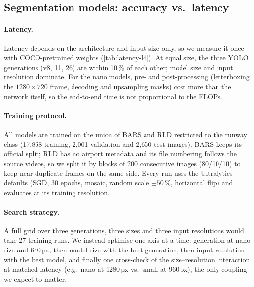 \subsection{Segmentation models: accuracy vs.\ latency}
\label{sec:exp-models}
\paragraph{Latency.}
Latency depends on the architecture and input size only, so we measure it once with COCO-pretrained weights (\cref{tab:latency-l4}).
At equal size, the three YOLO generations (v8, 11, 26) are within 10\,\% of each other; model size and input resolution dominate.
For the nano models, pre- and post-processing (letterboxing the $1280\times720$ frame, decoding and upsampling masks) cost more than the network itself, so the end-to-end time is not proportional to the FLOPs.



\paragraph{Training protocol.}
All models are trained on the union of BARS and RLD restricted to the runway class (17{,}858 training, 2{,}001 validation and 2{,}650 test images).
BARS keeps its official split; RLD has no airport metadata and its file numbering follows the source videos, so we split it by blocks of 200 consecutive images (80/10/10) to keep near-duplicate frames on the same side.
Every run uses the Ultralytics defaults (SGD, 30 epochs, mosaic, random scale $\pm50\,\%$, horizontal flip) and evaluates at its training resolution.

\paragraph{Search strategy.}
A full grid over three generations, three sizes and three input resolutions would take 27 training runs.
We instead optimise one axis at a time: generation at nano size and 640\,px, then model size with the best generation, then input resolution with the best model, and finally one cross-check of the size--resolution interaction at matched latency (e.g.\ nano at 1280\,px vs.\ small at 960\,px), the only coupling we expect to matter.

